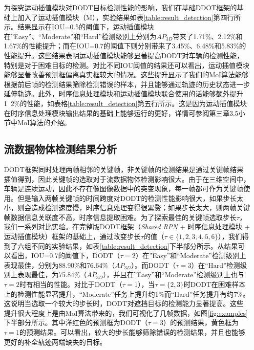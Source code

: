 为探究运动插值模块对DODT目标检测性能的影响，我们在基础DDOT框架的基础上加入了运动插值模块（M），实验结果如表\ref{table:result_detection}第四行所示。结果显示在IOU=0.5的阈值下，运动插值模块在”Easy”、“Moderate”和“Hard”检测级别上分别为$AP_{3D}$带来了1.71\%、2.12\%和1.67\%的性能提升；而在IOU=0.7的阈值下则分别带来了3.45\%、6.48\%和5.83\%的性能提升。这些结果表明运动插值模块能够显著提高DODT对车辆的检测性能，特别是对于困难目标的检测。对比不同IOU阈值的结果还可以看出，运动插值模块能够显著改善预测框偏离真实框较大的情况。这些提升显示了我们的MoI算法能够根据前后帧的检测结果筛除检测错误的样本，并且能够通过轨迹的历史状态进一步延伸轨迹。此外，时序信息处理模块和运动插值模块联合使用的话能够额外提升1~2\%的性能，如表格\ref{table:result_detection}第五行所示。这是因为运动插值模块在时序信息处理模块输出结果的基础上能够运行的更好，详情可参阅第三章3.5小节中MoI算法的介绍。



\subsection{流数据物体检测结果分析}
\label{stream_result}



DODT框架同时处理两帧相邻的关键帧，非关键帧的检测结果是通过关键帧结果插值得到，因此关键帧的选取对于流数据物体检测影响很大。由于在三维空间中，车辆是连续运动，因此不存在像图像数据中的突变现象，每一帧都可作为关键帧使用。但是输入两帧关键帧的时间跨度对DODT的检测性能影响很大，如果步长太小，则会造成检测速度慢，时序信息处理变得很累赘；如果步长太大，则两帧关键帧数据信息关联度不高，时序信息提取困难。为了探索最佳的关键帧选取步长$\tau$，我们一系列对比实验。在完整版DODT框架（\textit{Shared RPN} + 时序信息处理模块 + 运动插值模块）框架的基础上，通过改变步长$\tau$的值（$\tau \in \{1,2,3,4,5,6\}$），我们得到了六组不同的实验结果，如表\ref{table:result_detection}下半部分所示。从结果可以看出，IOU=0.7的阈值下，DODT（$\tau = 2$）在”Easy”和“Moderate”检测级别上表现最佳，分别为88.90\%和76.64\%（$AP_{3D}$）。而DODT（$\tau = 3$）在“Hard”检测级别上表现最佳，为75.84\%（$AP_{3D}$），并且在”Easy”和“Moderate”检测级别上也与$\tau = 2$时有相当的性能。对比于DODT（$\tau = 1$），当$\tau = \{2,3\}$时DODT在困难样本上的检测性能显著提升，“Moderate”任务上提升约1\%而“Hard”任务提升有约7\%。这说明当选取一个较大的步长时，DODT对遮挡目标的检测能力显著提高。这些提升很大程度上是由MoI算法带来的，我们可视化了几帧数据，如图\ref{fig:examples}下半部分所示。其中洋红色的预测框为DODT（$\tau=3$）的预测结果，黄色框为$\tau = 1$的预测结果。可以看出，较大的步长能够筛除错误的检测结果，并且也能够更好的补全轨迹两端缺失的目标。

